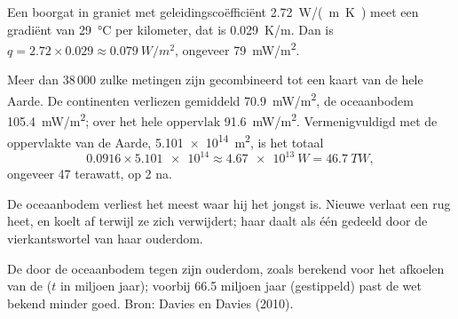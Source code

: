 \begin{example}\label{ex:g12:internal-heat:borehole}
Een boorgat in graniet met geleidingscoëfficiënt \qty{2.72}{W/(m.K)} meet een
gradiënt van \qty{29}{\celsius} per kilometer, dat is \qty{0.029}{K/m}.
Dan is $q = 2.72 \times 0.029 \approx \qty{0.079}{W/m^2}$, ongeveer
\qty{79}{mW/m^2}.
\end{example}

Meer dan 38\,000 zulke metingen zijn gecombineerd tot een kaart van de
hele Aarde. De continenten verliezen gemiddeld \qty{70.9}{mW/m^2}, de
oceaanbodem \qty{105.4}{mW/m^2}; over het hele oppervlak \qty{91.6}{mW/m^2}.
Vermenigvuldigd met de oppervlakte van de Aarde, \qty{5.101e14}{m^2}, is het totaal
\[
  0.0916 \times \num{5.101e14} \approx \qty{4.67e13}{W} = \qty{46.7}{TW},
\]
ongeveer 47 terawatt, op 2 na.

De oceaanbodem verliest het meest waar hij het jongst is. Nieuwe  verlaat een
rug heet, en koelt af terwijl ze zich verwijdert; haar  daalt als één gedeeld door de
vierkantswortel van haar ouderdom.

\begin{omfigure}

{\small De  door de oceaanbodem tegen zijn ouderdom, zoals berekend voor
het afkoelen van de  ($t$ in miljoen jaar); voorbij 66.5
miljoen jaar (gestippeld) past de wet bekend minder goed. Bron: Davies
en Davies (2010).}
\end{omfigure}

